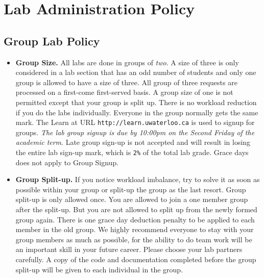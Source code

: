 \chapter*{Lab Administration Policy }

\section*{Group Lab Policy}

    \begin{itemize}
    \item {\bf Group Size.} All labs are done in groups of {\em two}. 
        A size of three is only considered in a lab section that has 
        an odd number of students and only one group is allowed to have
        a size of three. All group of three requests are processed on
        a first-come first-served basis. 
        A group size of one is not permitted except that your group is
        split up. There is no workload reduction if you do 
        the labs individually. 
        Everyone in the group normally gets the same mark.
        The Learn at URL 
        \verb+http://learn.uwaterloo.ca+
        is used to signup for groups.
        {\em The lab group signup is due by 10:00pm on the Second Friday of
        the academic term}. Late group sign-up is not accepted and will
        result in losing the entire lab sign-up mark, which is \verb+2%+
        of the total lab grade. Grace days does not apply to Group Signup.
	       
    \item {\bf Group Split-up.} 
            If you notice workload imbalance, try to solve it as soon as possible 
            within your group or split-up the group as the last resort. 
            Group split-up is only allowed once. You are allowed to join a one member group
            after the split-up. But you are not allowed to split up from the newly formed group again.
            There is one grace day deduction penalty to be applied to each member in the old group. 
            We highly recommend everyone to stay with your group members as much as possible, for the ability to do team work will be an important skill in your future career.
            Please choose your lab partners carefully. 
            A copy of the code and documentation completed before the group split-up 
            will be given  to each individual in the group.
            

\end{itemize}
